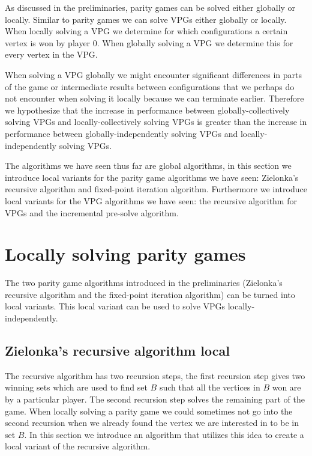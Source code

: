 As discussed in the preliminaries, parity games can be solved either globally or locally. Similar to parity games we can solve VPGs either globally or locally. When locally solving a VPG we determine for which configurations a certain vertex is won by player $0$. When globally solving a VPG we determine this for every vertex in the VPG.

When solving a VPG globally we might encounter significant differences in parts of the game or intermediate results between configurations that we perhaps do not encounter when solving it locally because we can terminate earlier. Therefore we hypothesize that the increase in performance between globally-collectively solving VPGs and locally-collectively solving VPGs is greater than the increase in performance between globally-independently solving VPGs and locally-independently solving VPGs.

The algorithms we have seen thus far are global algorithms, in this section we introduce local variants for the parity game algorithms we have seen: Zielonka's recursive algorithm and fixed-point iteration algorithm. Furthermore we introduce local variants for the VPG algorithms we have seen: the recursive algorithm for VPGs and the incremental pre-solve algorithm.

\section{Locally solving parity games}
The two parity game algorithms introduced in the preliminaries (Zielonka's recursive algorithm and the fixed-point iteration algorithm) can be turned into local variants. This local variant can be used to solve VPGs locally-independently.

\subsection{Zielonka's recursive algorithm local}
\label{sec:zlnk_org_local}
The recursive algorithm has two recursion steps, the first recursion step gives two winning sets which are used to find set $B$ such that all the vertices in $B$ won are by a particular player. The second recursion step solves the remaining part of the game. When locally solving a parity game we could sometimes not go into the second recursion when we already found the vertex we are interested in to be in set $B$. In this section we introduce an algorithm that utilizes this idea to create a local variant of the recursive algorithm.

